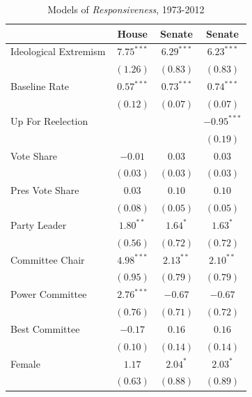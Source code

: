 \documentclass[12pt]{article}
\begin{document}
\begin{table}[!htbp]
\centering
\begin{threeparttable}
\caption{Models of \textit{Responsiveness}, 1973-2012}
\label{tab-responsiveness-regressions}
\singlespacing
\begin{tabular}{l c c c }
\hline
& House & Senate & Senate \\
\hline
Ideological Extremism & $7.75^{***}$ & $6.29^{***}$ & $6.23^{***}$  \\
                      & $(1.26)$     & $(0.83)$     & $(0.83)$      \\
Baseline Rate         & $0.57^{***}$ & $0.73^{***}$ & $0.74^{***}$  \\
                      & $(0.12)$     & $(0.07)$     & $(0.07)$      \\
Up For Reelection     &              &              & $-0.95^{***}$ \\
                      &              &              & $(0.19)$      \\
Vote Share            & $-0.01$      & $0.03$       & $0.03$        \\
                      & $(0.03)$     & $(0.03)$     & $(0.03)$      \\
Pres Vote Share       & $0.03$       & $0.10$       & $0.10$        \\
                      & $(0.08)$     & $(0.05)$     & $(0.05)$      \\
Party Leader          & $1.80^{**}$  & $1.64^{*}$   & $1.63^{*}$    \\
                      & $(0.56)$     & $(0.72)$     & $(0.72)$      \\
Committee Chair       & $4.98^{***}$ & $2.13^{**}$  & $2.10^{**}$   \\
                      & $(0.95)$     & $(0.79)$     & $(0.79)$      \\
Power Committee       & $2.76^{***}$ & $-0.67$      & $-0.67$       \\
                      & $(0.76)$     & $(0.71)$     & $(0.72)$      \\
Best Committee        & $-0.17$      & $0.16$       & $0.16$        \\
                      & $(0.10)$     & $(0.14)$     & $(0.14)$      \\
Female                & $1.17$       & $2.04^{*}$   & $2.03^{*}$    \\
                      & $(0.63)$     & $(0.88)$     & $(0.89)$      \\

\end{tabular}
\end{threeparttable}
\end{table}
\end{document}
